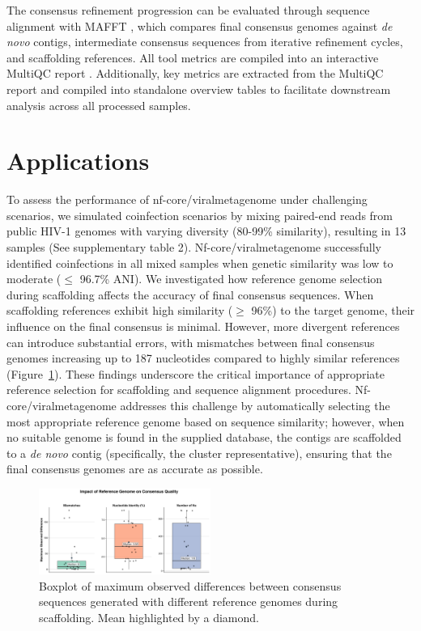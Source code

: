 The consensus refinement progression can be evaluated through sequence alignment with MAFFT \cite{Katoh2002-ox}, which compares final consensus genomes against \textit{de novo} contigs, intermediate consensus sequences from iterative refinement cycles, and scaffolding references. All tool metrics are compiled into an interactive MultiQC report \cite{Ewels2016-hs}. Additionally, key metrics are extracted from the MultiQC report and compiled into standalone overview tables to facilitate downstream analysis across all processed samples.

\section{Applications}

To assess the performance of nf-core/viralmetagenome under challenging scenarios, we simulated coinfection scenarios by mixing paired-end reads from public HIV-1 genomes with varying diversity (80-99\% similarity), resulting in 13 samples (See supplementary table 2). Nf-core/viralmetagenome successfully identified coinfections in all mixed samples when genetic similarity was low to moderate ($\leq$ 96.7\% ANI).
We investigated how reference genome selection during scaffolding affects the accuracy of final consensus sequences. When scaffolding references exhibit high similarity ($\geq$ 96\%) to the target genome, their influence on the final consensus is minimal. However, more divergent references can introduce substantial errors, with mismatches between final consensus genomes increasing up to 187 nucleotides compared to highly similar references (Figure~\ref{fig:reference-influence}). These findings underscore the critical importance of appropriate reference selection for scaffolding and sequence alignment procedures. Nf-core/viralmetagenome addresses this challenge by automatically selecting the most appropriate reference genome based on sequence similarity; however, when no suitable genome is found in the supplied database, the contigs are scaffolded to a \textit{de novo} contig (specifically, the cluster representative), ensuring that the final consensus genomes are as accurate as possible.

\begin{figure}[htbp]
    \centering
    \includegraphics[width=0.5\textwidth]{Fig/fig2.png}
    \caption{Boxplot of maximum observed differences between consensus sequences generated with different reference genomes during scaffolding. Mean highlighted by a diamond.}
    \label{fig:reference-influence}
\end{figure}


